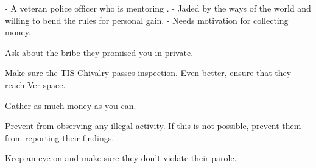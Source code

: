 \documentclass[char]{guildcamp4}
\begin{document}
\name{\cCbad{}}

- A veteran police officer who is mentoring \cCgood{}.
- Jaded by the ways of the world and willing to bend the rules for personal gain.
- Needs motivation for collecting money.

\begin{itemz}[Goals]
	\item Ask \cVone{} about the bribe they promised you in private.
	\item Make sure the TIS Chivalry passes inspection. Even better, ensure that they reach Ver space.
	\item Gather as much money as you can.
	\item Prevent \cCgood{} from observing any illegal activity. If this is not possible, prevent them from reporting their findings.
	\item Keep an eye on \cProbie{} and make sure they don't violate their parole. 
\end{itemz}

\begin{itemz}[Notes]
	\item 
\end{itemz}

\begin{contacts}
	\contact{\cTest{}}
\end{contacts}
\end{document}
